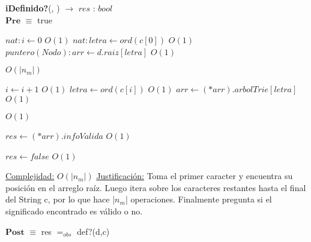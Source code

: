 \begin{algorithm}[H]{\textbf{iDefinido?}(, ) $\to$ $res$ : $bool$}
	{\\ $\textbf{Pre}$ $\equiv$ true}
	\begin{algorithmic}

		\State $nat: i \gets 0$ \Comment $O(1)$
		\State $nat: letra \gets ord(c[0])$ \Comment $O(1)$
		\State $puntero(Nodo): arr \gets d.raiz[letra]$ \Comment $O(1)$

		 \Comment $O(|n_m|)$

			\State $i \gets i + 1$ \Comment $O(1)$
			\State $letra \gets ord(c[i])$ \Comment $O(1)$
			\State $arr \gets (*arr).arbolTrie[letra]$ \Comment $O(1)$

		\EndWhile

		 \Comment $O(1)$
		
			\State $res \gets (*arr).infoValida$ \Comment $O(1)$

		\Else

			\State $res \gets false$ \Comment $O(1)$

		\EndIf

		\medskip
		\Statex \underline{Complejidad:} $O(|n_m|)$
		\Statex \underline{Justificación:} Toma el primer caracter y encuentra su posición en el arreglo raíz. Luego itera sobre los caracteres restantes hasta el final del String c, por lo que hace |$n_m$| operaciones. Finalmente pregunta si el significado encontrado es válido o no.
    \end{algorithmic}
    {$\textbf{Post}$ $\equiv$ res $=_{obs}$ def?(d,c)}
\end{algorithm}


